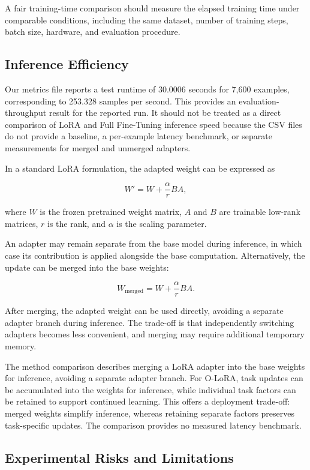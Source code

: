 A fair training-time comparison should measure the elapsed
training time under comparable conditions, including the same
dataset, number of training steps, batch size, hardware, and
evaluation procedure.

\subsection{Inference Efficiency}

Our metrics file reports a test runtime of 30.0006 seconds
for 7,600 examples, corresponding to 253.328 samples per second.
This provides an evaluation-throughput result for the reported
run. It should not be treated as a direct comparison of LoRA
and Full Fine-Tuning inference speed because the CSV files do
not provide a baseline, a per-example latency benchmark, or
separate measurements for merged and unmerged adapters.

In a standard LoRA formulation, the adapted weight can be
expressed as

$$
	W' = W + \frac{\alpha}{r}BA,
$$

where $W$ is the frozen pretrained weight matrix, $A$ and $B$
are trainable low-rank matrices, $r$ is the rank, and
$\alpha$ is the scaling parameter.

An adapter may remain separate from the base model during
inference, in which case its contribution is applied alongside
the base computation. Alternatively, the update can be merged
into the base weights:

$$
	W_{\mathrm{merged}} =
	W + \frac{\alpha}{r}BA.
$$

After merging, the adapted weight can be used directly, avoiding
a separate adapter branch during inference. The trade-off is
that independently switching adapters becomes less convenient,
and merging may require additional temporary memory.

The method comparison describes merging a LoRA adapter into the
base weights for inference, avoiding a separate adapter branch.
For O-LoRA, task updates can be accumulated into the weights for
inference, while individual task factors can be retained to support
continued learning. This offers a deployment trade-off: merged
weights simplify inference, whereas retaining separate factors
preserves task-specific updates. The comparison provides no measured
latency benchmark.

\subsection{Experimental Risks and Limitations}

